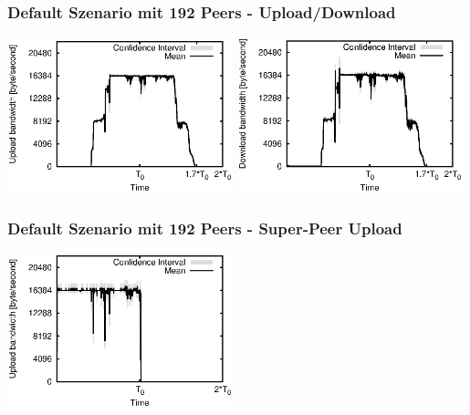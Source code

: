 \begin{frame}
  \frametitle{Default Szenario mit 192 Peers - Upload/Download}
  \begin{center}
    \includegraphics[width=0.49\textwidth]{fig/plots/scenario_11_peer_count_192_v2/plots/GeneratedMeanCurrentUploadBandwidth.csv.eps}
    \includegraphics[width=0.49\textwidth]{fig/plots/scenario_11_peer_count_192_v2/plots/GeneratedMeanCurrentDownloadBandwidth.csv.eps}
  \end{center}
\end{frame}


\begin{frame}
  \frametitle{Default Szenario mit 192 Peers - Super-Peer Upload}
  \begin{center}
    \includegraphics[width=0.49\textwidth]{fig/plots/scenario_11_peer_count_192_v2/plots/GeneratedMeanCurrentSuperSeederUploadBandwidth.csv.eps}
  \end{center}
\end{frame}




